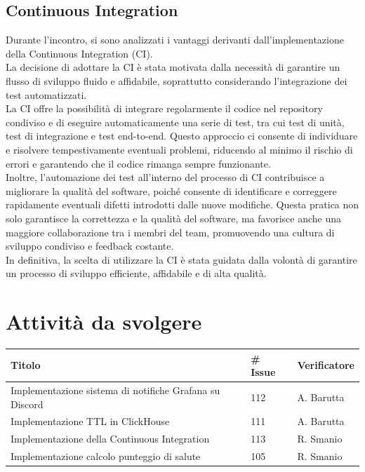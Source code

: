 \documentclass{article}
\begin{document}
    \subsection{Continuous Integration}
    Durante l'incontro, si sono analizzati i vantaggi derivanti dall'implementazione della Continuous Integration (CI). \\
    La decisione di adottare la CI è stata motivata dalla necessità di garantire un flusso di sviluppo fluido e affidabile, soprattutto considerando l'integrazione dei test automatizzati.\\
    La CI offre la possibilità di integrare regolarmente il codice nel repository condiviso e di eseguire automaticamente una serie di test, tra cui test di unità, test di integrazione e test end-to-end. Questo approccio ci consente di individuare e risolvere tempestivamente eventuali problemi, riducendo al minimo il rischio di errori e garantendo che il codice rimanga sempre funzionante.\\
    Inoltre, l'automazione dei test all'interno del processo di CI contribuisce a migliorare la qualità del software, poiché consente di identificare e correggere rapidamente eventuali difetti introdotti dalle nuove modifiche. Questa pratica non solo garantisce la correttezza e la qualità del software, ma favorisce anche una maggiore collaborazione tra i membri del team, promuovendo una cultura di sviluppo condiviso e feedback costante.\\
    In definitiva, la scelta di utilizzare la CI è stata guidata dalla volontà di garantire un processo di sviluppo efficiente, affidabile e di alta qualità.

    \section{Attività da svolgere}
    \begin{center}
        \begin{tabular}{|C{7cm}|C{1,5cm}|C{3cm}|}
            \hline
            \textbf{Titolo} & \textbf{\# Issue} & \textbf{Verificatore} \\
            \hline
            \hline
            Implementazione sistema di notifiche Grafana su Discord & 112 & A. Barutta \\
            \hline
            Implementazione TTL in ClickHouse & 111 & A. Barutta \\
            \hline
            Implementazione della Continuous Integration & 113 & R. Smanio \\
            \hline
            Implementazione calcolo punteggio di salute & 105 & R. Smanio\\
            \hline
        \end{tabular}
    \end{center}
\end{document}
